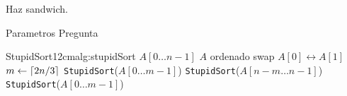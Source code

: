 \documentclass[main.tex]{subfiles}
\begin{document}
\begin{cajaEnunciado}
Haz sandwich.
\end{cajaEnunciado}

{Parametros}
{Pregunta}

\begin{algoritmo}{StupidSort}{12cm}{alg:stupidSort}
    \Require $A[0 \dots n-1]$
    \Ensure $A$ ordenado
        \State swap $A[0] \leftrightarrow A[1]$
        \State $m \leftarrow \left\lceil2n/3\right\rceil$
        \State \texttt{StupidSort}($A[0 \dots m-1]$)
        \State \texttt{StupidSort}($A[n-m \dots n-1]$)
        \State \texttt{StupidSort}($A[0 \dots m-1]$)
    \EndIf
\end{algoritmo}
\end{document}
